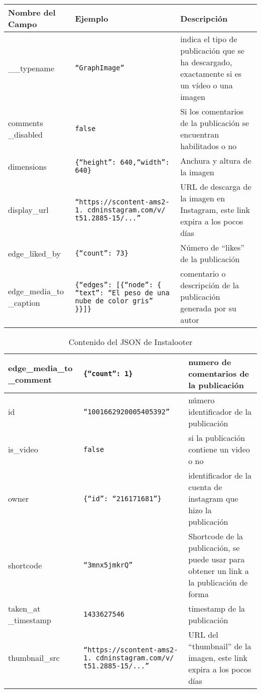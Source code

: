 \begin{table}[H]
    \centering
    \begin{tabular}{|p{}|p{}|p{}|}
    \hline
    Nombre del Campo & Ejemplo & Descripción \\ \hline
    \_\_typename & \texttt{``GraphImage''} & indica el tipo de publicación que se ha descargado, exactamente si es un vídeo o una imagen \\ \hline
    comments \_disabled & \texttt{false} & Si los comentarios de la publicación se encuentran habilitados o no \\ \hline
    dimensions & \texttt{\{``height'': 640,``width'': 640\}} & Anchura y altura de la imagen \\ \hline
    display\_url & \texttt{``https://scontent-ams2-1.
    cdninstagram.com/v/ t51.2885-15/...''} & URL de descarga de la imagen en Instagram, este link expira a los pocos días \\ \hline
    edge\_liked\_by & \texttt{\{``count'': 73\}} & Número de ``likes'' de la publicación \\ \hline
    edge\_media\_to \_caption & \texttt{\{``edges'': {[}\{``node'': \{ ``text'': ``El peso de una nube de color gris'' \}\}{]}\}} & comentario o descripción de la publicación generada por su autor \\ \hline
    \end{tabular}
\end{table}
\begin{table}[H]
    \centering
    \begin{tabular}{|p{}|p{}|p{}|}
    \hline
    edge\_media\_to \_comment & \texttt{\{``count'': 1\}} & numero de comentarios de la publicación \\ \hline
    id & \texttt{``1001662920005405392''} & número identificador de la publicación \\ \hline
    is\_video & \texttt{false} & si la publicación contiene un video o no \\ \hline
    owner & \texttt{\{``id'': ``216171681''\}} & identificador de la cuenta de instagram que hizo la publicación \\ \hline
    shortcode & \texttt{``3mnx5jmkrQ''} & Shortcode de la publicación, se puede usar para obtener un link a la publicación de forma \\ \hline
    taken\_at \_timestamp & \texttt{1433627546} & timestamp de la publicación \\ \hline
    thumbnail\_src & \texttt{``https://scontent-ams2-1.
    cdninstagram.com/v/ t51.2885-15/...'' }& URL del ``thumbnail'' de la imagen, este link expira a los pocos días \\ \hline
    \end{tabular}
    \caption{Contenido del JSON de Instalooter}
    \label{tab:json_instalooter}
\end{table}


